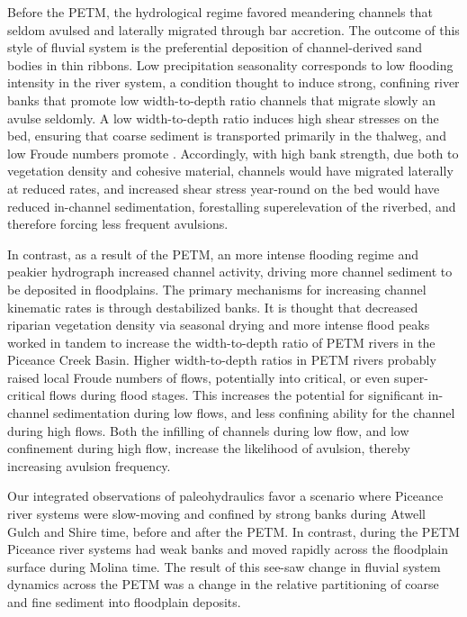 \documentclass[draft]{compact_proposal}
\begin{document}
Before the PETM, the  hydrological regime favored meandering channels that seldom avulsed and laterally migrated through bar accretion.
The outcome of this style of fluvial system is the preferential deposition of channel-derived sand bodies in thin ribbons.
Low precipitation seasonality corresponds to low flooding intensity in the river system, a condition thought to induce strong, confining river banks that promote low width-to-depth ratio channels that migrate slowly an avulse seldomly.
A low width-to-depth ratio induces high shear stresses on the bed, ensuring that coarse sediment is transported primarily in the thalweg, and low Froude numbers promote \pnote[something].
Accordingly, with high bank strength, due both to vegetation density and cohesive material, channels would have migrated laterally at reduced rates, and increased shear stress year-round on the bed would have reduced in-channel sedimentation, forestalling superelevation of the riverbed, and therefore forcing less frequent avulsions.

In contrast, as a result of the PETM, an more intense flooding regime and peakier hydrograph increased channel activity, driving more channel sediment to be deposited in floodplains.
The primary mechanisms for increasing channel kinematic rates is through destabilized banks.
It is thought that decreased riparian vegetation density via seasonal drying and more intense flood peaks worked in tandem to increase the width-to-depth ratio of PETM rivers in the Piceance Creek Basin.
Higher width-to-depth ratios in PETM rivers probably raised local Froude numbers of flows, potentially into critical, or even super-critical flows during flood stages.
This increases the potential for significant in-channel sedimentation during low flows, and less confining ability for the channel during high flows.
Both the infilling of channels during low flow, and low confinement during high flow, increase the likelihood of avulsion, thereby increasing avulsion frequency.

Our integrated observations of paleohydraulics favor a scenario where Piceance river systems were slow-moving and confined by strong banks during Atwell Gulch and Shire time, before and after the PETM.
In contrast, during the PETM Piceance river systems had weak banks and moved rapidly across the floodplain surface during Molina time.
The result of this see-saw change in fluvial system dynamics across the PETM was a change in the relative partitioning of coarse and fine sediment into floodplain deposits.
\end{document}
